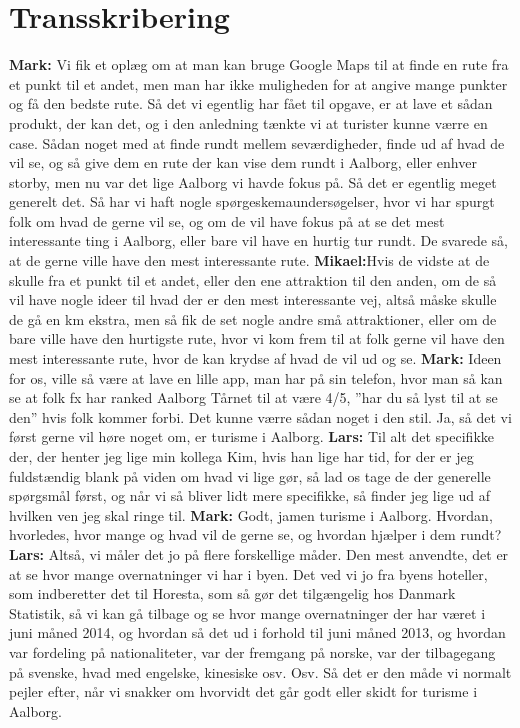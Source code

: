 \chapter{Transskribering}
\textbf{Mark:} Vi fik et oplæg om at man kan bruge Google Maps til at finde en rute fra et punkt til et andet, men man har ikke muligheden for at angive mange punkter og få den bedste rute. Så det vi egentlig har fået til opgave, er at lave et sådan produkt, der kan det, og i den anledning tænkte vi at turister kunne værre en case. Sådan noget med at finde rundt mellem seværdigheder, finde ud af hvad de vil se, og så give dem en rute der kan vise dem rundt i Aalborg, eller enhver storby, men nu var det lige Aalborg vi havde fokus på. Så det er egentlig meget generelt det. Så har vi haft nogle spørgeskemaundersøgelser, hvor vi har spurgt folk om hvad de gerne vil se, og om de vil have fokus på at se det mest interessante ting i Aalborg, eller bare vil have en hurtig tur rundt. De svarede så, at de gerne ville have den mest interessante rute. \newline
\textbf{Mikael:}Hvis de vidste at de skulle fra et punkt til et andet, eller den ene attraktion til den anden, om de så vil have nogle ideer til hvad der er den mest interessante vej, altså måske skulle de gå en km ekstra, men så fik de set nogle andre små attraktioner, eller om de bare ville have den hurtigste rute, hvor vi kom frem til at folk gerne vil have den mest interessante rute, hvor de kan krydse af hvad de vil ud og se. \newline
\textbf{Mark:} Ideen for os, ville så være at lave en lille app, man har på sin telefon, hvor man så kan se at folk fx har ranked Aalborg Tårnet til at være 4/5, ”har du så lyst til at se den” hvis folk kommer forbi. Det kunne værre sådan noget i den stil. Ja, så det vi først gerne vil høre noget om, er turisme i Aalborg. \newline
\textbf{Lars:} Til alt det specifikke der, der henter jeg lige min kollega Kim, hvis han lige har tid, for der er jeg fuldstændig blank på viden om hvad vi lige gør, så lad os tage de der generelle spørgsmål først, og når vi så bliver lidt mere specifikke, så finder jeg lige ud af hvilken ven jeg skal ringe til. \newline
\textbf{Mark:} Godt, jamen turisme i Aalborg. Hvordan, hvorledes, hvor mange og hvad vil de gerne se, og hvordan hjælper i dem rundt? \newline
\textbf{Lars:} Altså, vi måler det jo på flere forskellige måder. Den mest anvendte, det er at se hvor mange overnatninger vi har i byen. Det ved vi jo fra byens hoteller, som indberetter det til Horesta, som så gør det tilgængelig hos Danmark Statistik, så vi kan gå tilbage og se hvor mange overnatninger der har været i juni måned 2014, og hvordan så det ud i forhold til juni måned 2013, og hvordan var fordeling på nationaliteter, var der fremgang på norske, var der tilbagegang på svenske, hvad med engelske, kinesiske osv. Osv. Så det er den måde vi normalt pejler efter, når vi snakker om hvorvidt det går godt eller skidt for turisme i Aalborg. \newline
